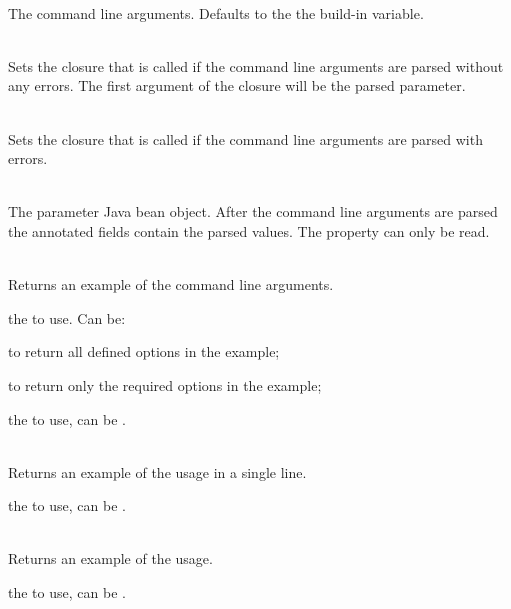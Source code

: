 \begin{asparadesc}
%
\item[\code{arguments: array|list}] \hfill \\
The command line arguments. Defaults to the the  build-in variable.
%
\item[\code{valid: closure}] \hfill \\
Sets the closure that is called if the command line arguments are parsed without
any errors. The first argument of the closure will be the parsed parameter.
%
\item[\code{notValid: closure}] \hfill \\
Sets the closure that is called if the command line arguments are parsed with
errors.
%
\item[\code{theParameter}] \hfill \\
The parameter Java bean object. After the command line arguments are parsed
the annotated fields contain the parsed values. The property can only be read.
%
\item[\code{printExample(exampleMode [, resourceBundle])}] \hfill \\
Returns an example of the command line arguments.
\begin{compactdesc}
%
\item[\code{exampleMode}]
the \cite{examplemode13} to use. Can be:
\begin{compactitem}
\item {} to return all defined options in the example; 
\item {} to return only the required options in the example; 
\end{compactitem}
%
\item[\code{resourceBundle}]
the \cite{resourcebundle13} to use, can be .
%
\end{compactdesc}
%
\item[\code{printSingleLineUsage([resourceBundle])}] \hfill \\
Returns an example of the usage in a single line.
\begin{compactdesc}
%
\item[\code{resourceBundle}]
the \cite{resourcebundle13} to use, can be .
%
\end{compactdesc}
%
\item[\code{printUsage([resourceBundle])}] \hfill \\
Returns an example of the usage.
\begin{compactdesc}
%
\item[\code{resourceBundle}]
the \cite{resourcebundle13} to use, can be .
%
\end{compactdesc}
%
\end{asparadesc}

